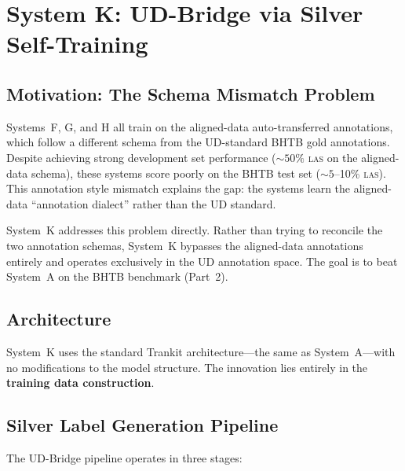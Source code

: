 \documentclass[12pt,a4paper,oneside]{report}
\newcommand{\las}{\textsc{las}}
\begin{document}
\section{System K: UD-Bridge via Silver Self-Training}
\label{sec:system_k}

\subsection{Motivation: The Schema Mismatch Problem}

Systems~F, G, and H all train on the aligned-data auto-transferred annotations, which
follow a different schema from the UD-standard BHTB gold annotations. Despite
achieving strong development set performance (${\sim}50\%$ \las{} on the aligned-data
schema), these systems score poorly on the BHTB test set (${\sim}5$--10\% \las{}).
This annotation style mismatch explains the gap: the systems learn the aligned-data
``annotation dialect'' rather than the UD standard.

System~K addresses this problem directly. Rather than trying to reconcile the two
annotation schemas, System~K bypasses the aligned-data annotations entirely and
operates exclusively in the UD annotation space. The goal is to beat System~A on the
BHTB benchmark (Part~2).

\subsection{Architecture}

System~K uses the standard Trankit architecture---the same as System~A---with no
modifications to the model structure. The innovation lies entirely in the
\textbf{training data construction}.

\subsection{Silver Label Generation Pipeline}

The UD-Bridge pipeline operates in three stages:
\end{document}
